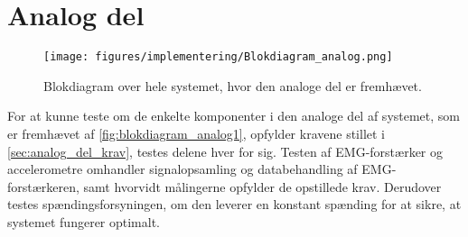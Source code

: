 \section{Analog del}
\begin{figure}[H]
\centering
\texttt{[image: figures/implementering/Blokdiagram\_analog.png]}
\caption{Blokdiagram over hele systemet, hvor den analoge del er fremhævet.}
\label{fig:blokdiagram_analog1}
\end{figure}


For at kunne teste om de enkelte komponenter i den analoge del af systemet, som er fremhævet af \autoref{fig:blokdiagram_analog1}, opfylder kravene stillet i \autoref{sec:analog_del_krav}, testes delene hver for sig. 
Testen af EMG-forstærker og accelerometre omhandler signalopsamling og databehandling af EMG-forstærkeren, samt hvorvidt målingerne opfylder de opstillede krav. 
Derudover testes spændingsforsyningen, om den leverer en konstant spænding for at sikre, at systemet fungerer optimalt. 